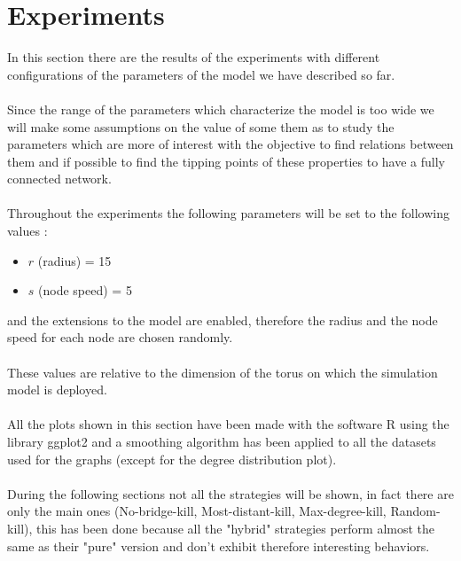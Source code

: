 \documentclass{llncs}
\begin{document}
\section{Experiments}
%
In this section there are the results of the experiments with different configurations of the parameters of the model we have described so far.\\\\
%
Since the range of the parameters which characterize the model is too wide we will make some assumptions on the value of some them as to study the parameters which are more of interest with the objective to find relations between them and if possible to find the tipping points of these properties to have a fully connected network.\\\\
%
Throughout the experiments the following parameters will be set to the following values : \\
%
\begin{itemize}
	\item $r$ (radius) = 15%
	\item $s$ (node speed) = 5%
\end{itemize}
%
and the extensions to the model are enabled, therefore the radius and the node speed for each node are chosen randomly.
\\\\
These values are relative to the dimension of the torus on which the simulation model is deployed.
\\\\
All the plots shown in this section have been made with the software R using the library ggplot2 and a smoothing algorithm has been applied to all the datasets used for the graphs (except for the degree distribution plot).
\\\\
During the following sections not all the strategies will be shown, in fact there are only the main ones (No-bridge-kill, Most-distant-kill, Max-degree-kill, Random-kill), this has been done because all the "hybrid" strategies perform almost the same as their "pure" version and don't exhibit therefore interesting behaviors.
\end{document}
